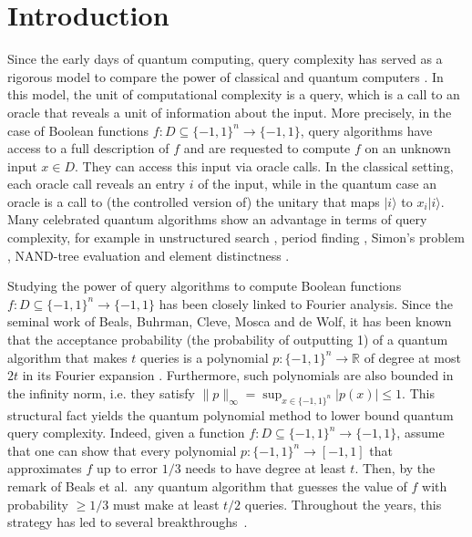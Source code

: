 \documentclass[11pt]{article}
\newcommand{\norm}[1]{\|#1\|}
\newcommand{\R}{\mathbb{R}} %
\newcommand{\1}{\mathbf{1}}
\newcommand{\ket}[1]{|#1\rangle}
\theoremstyle{plain}
\theoremstyle{definition}
\theoremstyle{remark}
\begin{document}
\section{Introduction}
Since the early days of quantum computing, query complexity has served as a rigorous model to compare the power of classical and quantum computers \cite{Ambainis:2018}. In this model, the unit of computational complexity is a query, which is a call to an oracle that reveals a unit of information about the input. More precisely, in the case of Boolean functions $f:D\subseteq \{-1,1\}^n\to\{-1,1\}$, query algorithms have access to a full description of $f$ and are requested to compute $f$ on an unknown input $x\in D$. They can access this input via oracle calls. In the classical setting, each oracle call reveals an entry $i$ of the input, while in the quantum case an oracle is a call to (the controlled version of) the unitary that maps $\ket{i}$ to $x_i\ket{i}$. Many celebrated quantum algorithms show an advantage in terms of query complexity, for example in unstructured search \cite{Grover:1996}, period finding \cite{Shor:1997}, Simon’s problem \cite{Simon}, NAND-tree evaluation \cite{farhi2007quantum} and element distinctness \cite{ambainis2007quantum}. 

Studying the power of query algorithms to compute Boolean functions $f:D\subseteq \{-1,1\}^n\to \{-1,1\}$ has been closely linked to Fourier analysis. Since the seminal work of Beals, Buhrman, Cleve, Mosca and de Wolf, it has been known that the acceptance probability (the probability of outputting 1) of a quantum algorithm that makes $t$ queries is a polynomial $p:\{-1,1\}^n\to\R$ of degree at most $2t$ in its Fourier expansion \cite{beals2001quantum}. Furthermore, such polynomials are also bounded in the infinity norm, i.e. they satisfy $\norm{p}_\infty=\sup_{x\in\{-1,1\}^n}|p(x)|\leq 1.$ This structural fact 
yields the quantum polynomial method to lower bound quantum query complexity. Indeed, given a function $f:D\subseteq \{-1,1\}^n\to\{-1,1\}$, assume that one can show that every polynomial $p:\{-1,1\}^n\to [-1,1]$ that approximates $f$ up to error $1/3$ needs to have degree at least $t.$ Then, by the remark of Beals et al.\, any quantum algorithm that guesses the value of $f$ with probability $\geq 1/3$ must make at least $t/2$ queries. Throughout the years, this strategy has led to several breakthroughs~\cite{aaronson2004quantum,BunKhotariThaler:2020,mande2020improved,bun2023approximate}.
\end{document}
